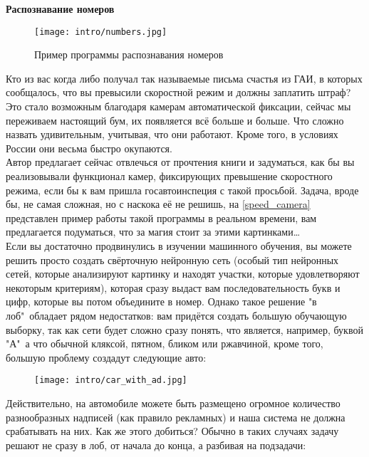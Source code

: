 \textbf{Распознавание номеров}\\
\begin{figure}
    \centering
    \texttt{[image: intro/numbers.jpg]}
    \caption{Пример программы распознавания номеров}
    \label{speed_camera}
\end{figure}

Кто из вас когда либо получал так называемые письма счастья из ГАИ, в которых сообщалось, что вы превысили скоростной режим и должны заплатить штраф? Это стало возможным благодаря камерам автоматической фиксации, сейчас мы переживаем настоящий бум, их появляется всё больше и больше. Что сложно назвать удивительным, учитывая, что они работают\cite{speed_cameras_and_safety_2005}\cite{speed_cameras_and_safety_2010}. Кроме того, в условиях России они весьма быстро окупаются\cite{speed_cameras_price}.\\

Автор предлагает сейчас отвлечься от прочтения книги и задуматься, как бы вы реализовывали функционал камер, фиксирующих превышение скоростного режима, если бы к вам пришла госавтоинспеция с такой просьбой. Задача, вроде бы, не самая сложная, но с наскока её не решишь, на \autoref{speed_camera} представлен пример работы такой программы в реальном времени, вам предлагается подуматься, что за магия стоит за этими картинками\dots\\

Если вы достаточно продвинулись в изучении машинного обучения, вы можете решить просто создать свёрточную нейронную сеть (особый тип нейронных сетей, которые анализируют картинку и находят участки, которые удовлетворяют некоторым критериям), которая сразу выдаст вам последовательность букв и цифр, которые вы потом объедините в номер. Однако такое решение "в лоб"\ обладает рядом недостатков: вам придётся создать большую обучающую выборку, так как сети будет сложно сразу понять, что является, например, буквой "А"\, а что обычной кляксой, пятном, бликом или ржавчиной, кроме того, большую проблему создадут следующие авто:\\

\begin{figure}[H]
    \centering
    \texttt{[image: intro/car\_with\_ad.jpg]}\\
\end{figure}

Действительно, на автомобиле можете быть размещено огромное количество разнообразных надписей (как правило рекламных) и наша система не должна срабатывать на них. Как же этого добиться? Обычно в таких случаях задачу решают не сразу в лоб, от начала до конца, а разбивая на подзадачи:

